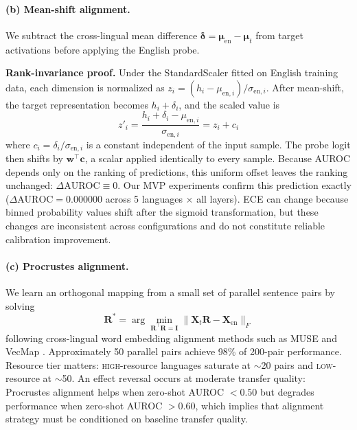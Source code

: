 \paragraph{(b) Mean-shift alignment.} We subtract the cross-lingual mean difference $\boldsymbol{\delta} = \boldsymbol{\mu}_{\text{en}} - \boldsymbol{\mu}_t$ from target activations before applying the English probe.

\textbf{Rank-invariance proof.} Under the StandardScaler fitted on English training data, each dimension is normalized as $z_i = (h_i - \mu_{\text{en},i}) / \sigma_{\text{en},i}$. After mean-shift, the target representation becomes $h_i + \delta_i$, and the scaled value is
\begin{equation}
  z'_i = \frac{h_i + \delta_i - \mu_{\text{en},i}}{\sigma_{\text{en},i}} = z_i + c_i
  \label{eq:meanshift}
\end{equation}
where $c_i = \delta_i / \sigma_{\text{en},i}$ is a constant independent of the input sample. The probe logit then shifts by $\mathbf{w}^\top \mathbf{c}$, a scalar applied identically to every sample. Because AUROC depends only on the ranking of predictions, this uniform offset leaves the ranking unchanged: $\Delta\text{AUROC} \equiv 0$. Our MVP experiments confirm this prediction exactly ($\Delta\text{AUROC} = 0.000000$ across 5 languages $\times$ all layers). ECE can change because binned probability values shift after the sigmoid transformation, but these changes are inconsistent across configurations and do not constitute reliable calibration improvement.

\paragraph{(c) Procrustes alignment.} We learn an orthogonal mapping from a small set of parallel sentence pairs by solving
\begin{equation}
  \mathbf{R}^* = \arg\min_{\mathbf{R}^\top\mathbf{R}=\mathbf{I}} \|\mathbf{X}_t\mathbf{R} - \mathbf{X}_{\text{en}}\|_F
  \label{eq:procrustes}
\end{equation}
following cross-lingual word embedding alignment methods such as MUSE \citep{conneau2018muse} and VecMap \citep{artetxe2018vecmap}.
Approximately 50 parallel pairs achieve 98\% of 200-pair performance. Resource tier matters: \textsc{high}-resource languages saturate at ${\sim}$20 pairs and \textsc{low}-resource at ${\sim}$50. An effect reversal occurs at moderate transfer quality: Procrustes alignment helps when zero-shot AUROC $< 0.50$ but degrades performance when zero-shot AUROC $> 0.60$, which implies that alignment strategy must be conditioned on baseline transfer quality.

